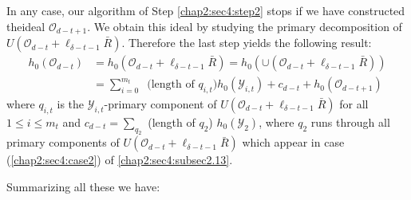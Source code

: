 \begin{enumerate}[(i)]
    In any case, our algorithm of Step \ref{chap2:sec4:step2} stops if we have
    constructed the\pageoriginale ideal $\mathscr{O}_{d-t+1}$. We
    obtain this ideal 
    by studying the primary decomposition of
    $U(\mathscr{O}_{d-t}+\ell_{\delta-t-1}\bar{R})$. Therefore the
    last step yields the following result:  
    \begin{align*}
      h_0(\mathscr{O}_{d-t}) & = h_0(\mathscr{O}_{d-t}+\ell_{\delta-t-1}
      \bar{R}) = h_0(\cup(\mathscr{O}_{d-t}+\ell_{\delta-t-1} \bar{R}))\\ 
      & = \sum_{i=0}^{m_t} ~\text{ (length of }q_{i,t}) h_0 (\mathscr{Y}_{i,t})
      + c_{d-t}+h_0 (\mathscr{O}_{d-t+1}) 
    \end{align*} 
    where $q_{i,t}$ is the $\mathscr{Y}_{i,t}$-primary component of
    $U(\mathscr{O}_{d-t}+\ell_{\delta-t-1} \bar{R})$ for all $1 \leq i
    \leq m_t$ and $c_{d-t}=\sum \limits_{q_2}$ (length of $q_2$)
    $h_0(\mathscr{Y}_2)$, where $q_2$ runs through all primary
    components of $U(\mathscr{O}_{d-t}+\ell_{\delta-t-1} \bar{R})$
    which appear in case (\ref{chap2:sec4:case2}) of
    \ref{chap2:sec4:subsec2.13}. 
\end{enumerate}

Summarizing all these we have: 
\setcounter{subsection}{17}
